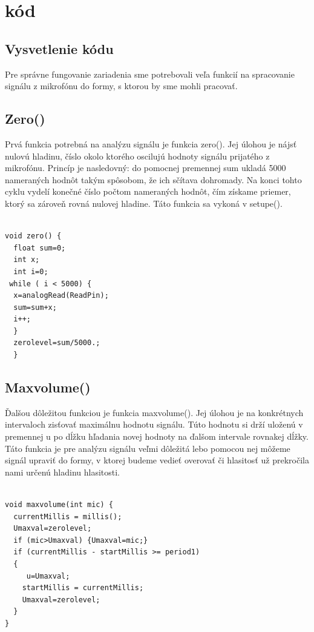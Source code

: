 \chapter{kód}
\section{Vysvetlenie kódu}

Pre správne fungovanie zariadenia sme potrebovali veľa funkcií na spracovanie signálu z mikrofónu do formy, s ktorou by sme mohli pracovať.

\section{Zero()}

Prvá funkcia potrebná na analýzu signálu je funkcia zero(). Jej úlohou je nájsť nulovú hladinu, číslo okolo ktorého oscilujú hodnoty signálu prijatého z mikrofónu. Princíp je nasledovný: do pomocnej premennej sum ukladá 5000 nameraných hodnôt takým spôsobom, že ich sčítava dohromady. Na konci tohto cyklu vydelí konečné číslo počtom nameraných hodnôt, čím získame priemer, ktorý sa zároveň rovná nulovej hladine. Táto funkcia sa vykoná v setupe(). 

\begin{lstlisting}

void zero() {
  float sum=0;
  int x;
  int i=0;
 while ( i < 5000) {
  x=analogRead(ReadPin);
  sum=sum+x;
  i++;
  }
  zerolevel=sum/5000.;
  }

\end{lstlisting}

\section{Maxvolume()}

Ďalšou dôležitou funkciou je funkcia maxvolume(). Jej úlohou je na konkrétnych intervaloch zisťovať maximálnu hodnotu signálu. Túto hodnotu si drží uloženú v premennej u po dĺžku hľadania novej hodnoty na ďalšom intervale rovnakej dĺžky. Táto funkcia je pre analýzu signálu veľmi dôležitá lebo pomocou nej môžeme signál upraviť do formy, v ktorej budeme vedieť overovať či hlasitosť už prekročila nami určenú hladinu hlasitosti. 

\begin{lstlisting}

void maxvolume(int mic) {
  currentMillis = millis();
  Umaxval=zerolevel;
  if (mic>Umaxval) {Umaxval=mic;}
  if (currentMillis - startMillis >= period1)
  {
     u=Umaxval;
    startMillis = currentMillis;
    Umaxval=zerolevel;
  }
}

\end{lstlisting}



